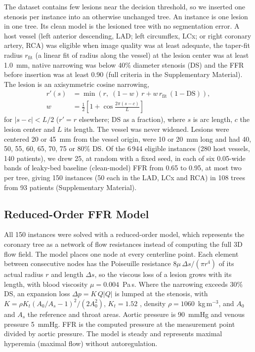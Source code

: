 \documentclass[journal,twoside,web]{ieeecolor}
\begin{document}
The dataset contains few lesions near the decision threshold, so we inserted one stenosis per instance into an
otherwise unchanged tree. An instance is one lesion in one tree. Its clean model is the lesioned tree with no segmentation error. A host vessel (left anterior descending, LAD; left circumflex, LCx; or right coronary artery, RCA) was eligible
when image quality was at least adequate, the taper-fit radius $r_\mathrm{fit}$ (a linear fit of radius along the vessel) at the
lesion center was at least 1.0~mm, native narrowing was below 40\% diameter stenosis (DS) and the FFR before
insertion was at least 0.90 (full criteria in the Supplementary Material). The lesion is an axisymmetric cosine narrowing,
\begin{equation}
\begin{aligned}
r'(s) &= \min\!\left(r,\; (1-w)\,r + w\,r_\mathrm{fit}\,(1-\mathrm{DS})\right),\\
w &= \tfrac{1}{2}\left[1+\cos\tfrac{2\pi (s-c)}{L}\right]
\end{aligned}
\end{equation}
for $|s-c|<L/2$ ($r'=r$ elsewhere; DS as a fraction), where $s$ is arc length, $c$ the lesion center and $L$ its length. The vessel was never widened.
Lesions were centered 20 or 45~mm from the vessel origin, were 10 or 20~mm long and had 40, 50, 55, 60, 65, 70, 75
or 80\% DS. Of the 6\,944 eligible instances (280 host vessels, 140 patients), we drew 25, at random with a fixed seed, in each of six 0.05-wide bands of
leaky-bed baseline (clean-model) FFR from 0.65 to 0.95, at most two per tree, giving 150 instances (50 each in the LAD, LCx and RCA) in 108 trees from 93
patients (Supplementary Material).

\subsection{Reduced-Order FFR Model}
All 150 instances were solved with a reduced-order model, which represents the coronary tree as a network of flow
resistances instead of computing the full 3D flow field. The model places one node at every centerline point. Each element between consecutive nodes has the Poiseuille
resistance $8\mu\,\Delta s/(\pi r^4)$ of its actual radius $r$ and length $\Delta s$, so the viscous loss of a lesion grows with its length, with blood viscosity
$\mu = 0.004$~Pa\,s. Where the narrowing exceeds 30\% DS, an expansion loss $\Delta p = K\,Q|Q|$ is lumped at the
stenosis, with $K = \rho K_t (A_0/A_s - 1)^2 / (2A_0^2)$, $K_t = 1.52$ \cite{young1973}, density
$\rho = 1060$~kg\,m$^{-3}$, and $A_0$ and $A_s$ the reference and throat areas. Aortic pressure is 90~mmHg and
venous pressure 5~mmHg. FFR is the computed
pressure at the measurement point divided by aortic pressure. The model is steady and represents maximal hyperemia
(maximal flow) without autoregulation.
\end{document}
